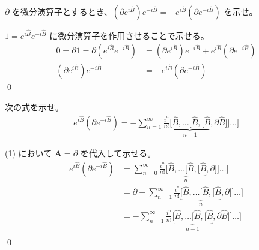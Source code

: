 \documentclass[uplatex,dvipdfmx,a4paper,11pt]{jlreq}
\makeatletter
\theoremstyle{definition}
\renewenvironment{proof}[1][\proofname]{\par
  \normalfont
  \topsep6\p@\@plus6\p@ \trivlist
  \item[\hskip\labelsep{\bfseries #1}\@addpunct{\bfseries}]\ignorespaces\quad\par
}{%
  \qed\endtrivlist\@endpefalse
}
\renewcommand\proofname{証明}
\newcommand{\BB}{\bm{B}}
\renewcommand{\AA}{\hat{A}}
\renewcommand{\BB}{\hat{B}}
\renewcommand{\AA}{\bm{A}}
\numberwithin{equation}{section}
\makeatother
\begin{document}
\begin{problem}
$\partial$ を微分演算子とするとき、$(\partial e^{i\BB})e^{-i\BB} = -e^{i\BB}(\partial e^{-i\BB})$ を示せ。
\end{problem}
\begin{proof}
  $1 = e^{i\BB}e^{-i\BB}$ に微分演算子を作用させることで示せる。
  \begin{align}
    0 = \partial 1 = \partial(e^{i\BB}e^{-i\BB}) & = (\partial e^{i\BB})e^{-i\BB} + e^{i\BB}(\partial e^{-i\BB}) \\
    (\partial e^{i\BB})e^{-i\BB}                 & = -e^{i\BB}(\partial e^{-i\BB})
  \end{align}
\end{proof}

\begin{problem}
次の式を示せ。
\begin{align}
  e^{i\BB}(\partial e^{-i\BB}) = -\sum_{n=1}^{\infty}\frac{i^n}{n!}\underbrace{[\BB, \ldots [\BB, [\BB}_{n-1}, \partial\BB]] \ldots]
\end{align}
\end{problem}
\begin{proof}
  (1) において $\AA = \partial$ を代入して示せる。
  \begin{align}
    e^{i\BB}(\partial e^{-i\BB}) & = \sum_{n=0}^{\infty}\frac{i^n}{n!}\underbrace{[\BB, \ldots [\BB, [\BB}_{n}, \partial]] \ldots]            \\
                                 & = \partial + \sum_{n=1}^{\infty}\frac{i^n}{n!}\underbrace{[\BB, \ldots [\BB, [\BB}_{n}, \partial]] \ldots] \\
                                 & = -\sum_{n=1}^{\infty}\frac{i^n}{n!}\underbrace{[\BB, \ldots [\BB, [\BB}_{n-1}, \partial\BB]] \ldots]      \\
  \end{align}
\end{proof}
\end{document}
